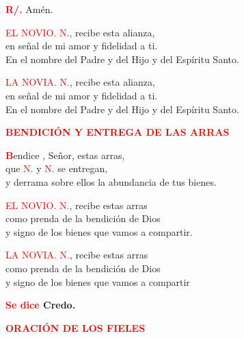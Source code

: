 \documentclass[12pt, letterpaper]{report}
\begin{document}
\Large \hspace{-0.9cm}  {\bfseries \textcolor{red}{R/.}} \hspace{0.5cm}  Am\'en. \newline

\textcolor{red}{EL NOVIO.} \newline
\textcolor{red}{N.}, recibe esta alianza, \\
en se\~nal de mi amor y fidelidad a ti. \\
En el nombre del Padre y del Hijo y del Esp\'iritu Santo. \newline

\textcolor{red}{LA NOVIA.} \newline
\textcolor{red}{N.}, recibe esta alianza, \\
en se\~nal de mi amor y fidelidad a ti. \\
En el nombre del Padre y del Hijo y del Esp\'iritu Santo. \newline


\Large {\bfseries \textcolor{red}{BENDICI\'ON Y ENTREGA DE LAS ARRAS}}

\lettrine[lines=1]{\bfseries \textcolor{red}{B}}{}\Large endice \Huge \textcolor{red}{},  \Large Se\~nor, estas arras, \\
que \textcolor{red}{N.} y \textcolor{red}{N.} se entregan, \\
y derrama sobre ellos la abundancia de tus bienes. \newline

\textcolor{red}{EL NOVIO.} \newline
\textcolor{red}{N.}, recibe estas arras \\
como prenda de la bendici\'on de Dios \\
y signo de los bienes que vamos a compartir. \newline

\textcolor{red}{LA NOVIA.} \newline
\textcolor{red}{N.}, recibe estas arras \\
como prenda de la bendici\'on de Dios \\
y signo de los bienes que vamos a compartir \newline

\Large {\bfseries \textcolor{red}{Se dice} Credo.}

\newpage

\Large {\bfseries \textcolor{red}{ORACI\'ON DE LOS FIELES}} \newline
\end{document}
